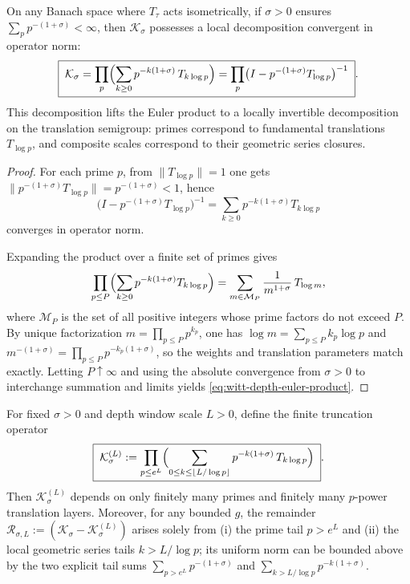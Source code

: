 \begin{theorem}\label{thm:witt-depth-euler-product}
On any Banach space where \(T_{\tau}\) acts isometrically, if \(\sigma>0\) ensures \(\sum_{p}p^{-(1+\sigma)}<\infty\), then \(\mathcal{K}_{\sigma}\) possesses a local decomposition convergent in operator norm:
\begin{equation}\label{eq:witt-depth-euler-product}
\boxed{\;
\mathcal{K}_{\sigma}
=\prod_{p}\Bigl(\sum_{k\ge 0}p^{-k(1+\sigma)}\,T_{k\log p}\Bigr)
=\prod_{p}\bigl(I-p^{-(1+\sigma)}T_{\log p}\bigr)^{-1}\; }.
\end{equation}
This decomposition lifts the Euler product to a locally invertible decomposition on the translation semigroup: primes correspond to fundamental translations \(T_{\log p}\), and composite scales correspond to their geometric series closures.
\end{theorem}
\begin{proof}
For each prime \(p\), from \(\|T_{\log p}\|=1\) one gets \(\|p^{-(1+\sigma)}T_{\log p}\|=p^{-(1+\sigma)}<1\), hence
\[
\bigl(I-p^{-(1+\sigma)}T_{\log p}\bigr)^{-1}
=\sum_{k\ge 0}p^{-k(1+\sigma)}T_{k\log p}
\]
converges in operator norm.
\par
Expanding the product over a finite set of primes gives
\[
\prod_{p\le P}\Bigl(\sum_{k\ge 0}p^{-k(1+\sigma)}T_{k\log p}\Bigr)
=\sum_{m\in\mathcal{M}_P}\frac{1}{m^{1+\sigma}}\,T_{\log m},
\]
where \(\mathcal{M}_P\) is the set of all positive integers whose prime factors do not exceed \(P\).
By unique factorization \(m=\prod_{p\le P}p^{k_p}\), one has \(\log m=\sum_{p\le P}k_p\log p\) and \(m^{-(1+\sigma)}=\prod_{p\le P}p^{-k_p(1+\sigma)}\), so the weights and translation parameters match exactly.
Letting \(P\uparrow\infty\) and using the absolute convergence from \(\sigma>0\) to interchange summation and limits yields \eqref{eq:witt-depth-euler-product}.
\end{proof}
\begin{corollary}\label{cor:witt-depth-finite-window-truncation}
For fixed \(\sigma>0\) and depth window scale \(L>0\), define the finite truncation operator
\begin{equation}\label{eq:witt-depth-finite-window-trunc-operator}
\boxed{\;
\mathcal{K}_{\sigma}^{(L)}
:=\prod_{p\le e^{L}}
\Bigl(\sum_{0\le k\le \lfloor L/\log p\rfloor}p^{-k(1+\sigma)}\,T_{k\log p}\Bigr)\; }.
\end{equation}
Then \(\mathcal{K}_{\sigma}^{(L)}\) depends on only finitely many primes and finitely many \(p\)-power translation layers.
Moreover, for any bounded \(g\), the remainder
\(
\mathcal{R}_{\sigma,L}:=(\mathcal{K}_{\sigma}-\mathcal{K}_{\sigma}^{(L)})
\)
arises solely from (i) the prime tail \(p>e^{L}\) and (ii) the local geometric series tails \(k>L/\log p\); its uniform norm can be bounded above by the two explicit tail sums
\(
\sum_{p>e^{L}}p^{-(1+\sigma)}
\)
and
\(
\sum_{k> L/\log p}p^{-k(1+\sigma)}
\).
\end{corollary}
